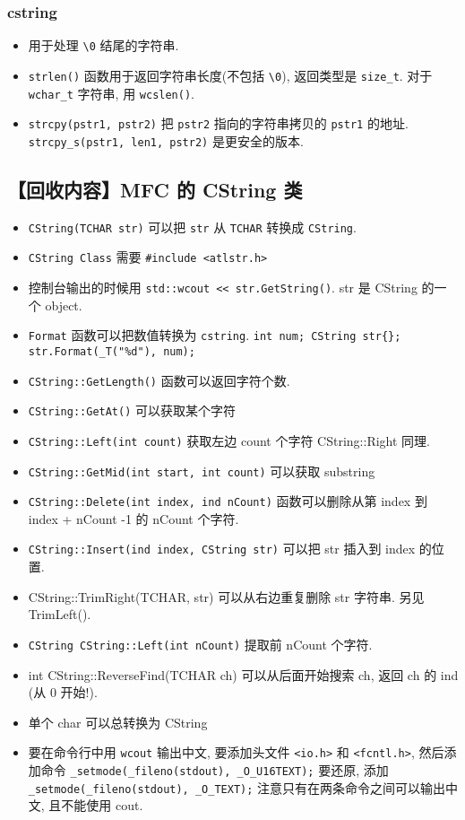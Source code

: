 \subsubsection{cstring}
\begin{itemize}
\item 用于处理 \verb`\0` 结尾的字符串.
\item \verb`strlen()` 函数用于返回字符串长度(不包括 \verb`\0`), 返回类型是 \verb`size_t`. 对于 \verb`wchar_t` 字符串, 用 \verb`wcslen()`.
\item \verb`strcpy(pstr1, pstr2)` 把 \verb`pstr2` 指向的字符串拷贝的 \verb`pstr1` 的地址. \verb`strcpy_s(pstr1, len1, pstr2)` 是更安全的版本.
\end{itemize}

\subsection{【回收内容】MFC 的 CString 类}
\begin{itemize}
\item \verb`CString(TCHAR str)` 可以把 \verb`str` 从 \verb`TCHAR` 转换成 \verb`CString`.
\item \verb`CString Class` 需要 \verb`#include <atlstr.h>`
\item 控制台输出的时候用 \verb`std::wcout << str.GetString()`.  str 是 CString 的一个 object.
\item \verb`Format` 函数可以把数值转换为 \verb`cstring`. \verb`int num; CString str{}; str.Format(_T("%d"), num);`
\item \verb`CString::GetLength()` 函数可以返回字符个数.
\item \verb`CString::GetAt()` 可以获取某个字符
\item \verb`CString::Left(int count)` 获取左边 count 个字符 CString::Right 同理.
\item \verb`CString::GetMid(int start, int count)` 可以获取 substring
\item \verb`CString::Delete(int index, ind nCount)` 函数可以删除从第 index 到 index + nCount -1 的 nCount 个字符.
\item \verb`CString::Insert(ind index, CString str)` 可以把 str 插入到 index 的位置.
\item CString::TrimRight(TCHAR, str) 可以从右边重复删除 str 字符串. 另见 TrimLeft().
\item \verb`CString CString::Left(int nCount)` 提取前 nCount 个字符.
\item int CString::ReverseFind(TCHAR ch) 可以从后面开始搜索 ch, 返回 ch 的 ind (从 0 开始!).
\item 单个 char 可以总转换为 CString

\item 要在命令行中用 \verb`wcout` 输出中文, 要添加头文件 \verb`<io.h>` 和 \verb`<fcntl.h>`, 然后添加命令 \verb|_setmode(_fileno(stdout), _O_U16TEXT);| 要还原, 添加 \verb|_setmode(_fileno(stdout), _O_TEXT);| 注意只有在两条命令之间可以输出中文, 且不能使用 cout.
\end{itemize}
